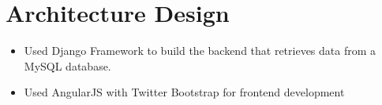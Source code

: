 \section{Architecture Design}
\begin{itemize}
\item Used Django Framework to build the backend that retrieves data from a MySQL database.

\item Used AngularJS with Twitter Bootstrap for frontend development
\end{itemize}






